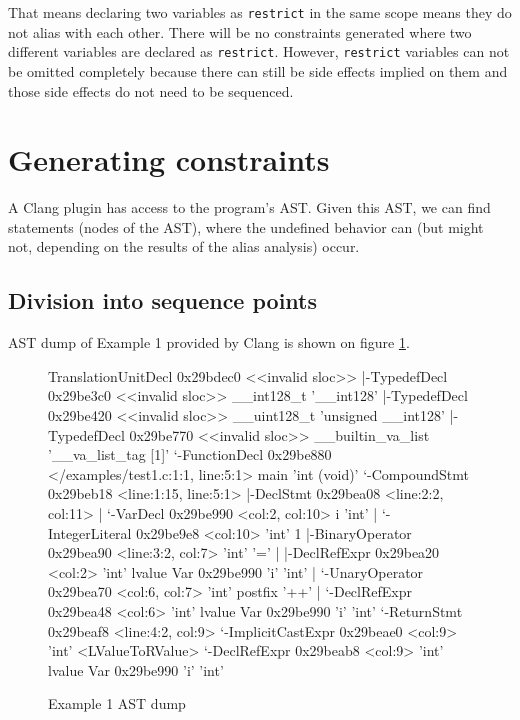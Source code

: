 That means declaring two variables as \verb|restrict| in the same scope means they do not alias with each other.
There will be no constraints generated where two different variables are declared as \verb|restrict|.
However, \verb|restrict| variables can not be omitted completely because there can still be side effects
implied on them and those side effects do not need to be sequenced.

\section{Generating constraints}
A Clang plugin has access to the program's AST. Given this AST, we can find statements (nodes of the AST), where the undefined behavior can (but might not, depending on the results of the alias analysis) occur.
\subsection{Division into sequence points}
AST dump of Example 1 provided by Clang is shown on figure \ref{ASTdump}.
\begin{figure}
\caption{Example 1 AST dump}
\label{ASTdump}
\begin{code}
TranslationUnitDecl 0x29bdec0 <<invalid sloc>>
|-TypedefDecl 0x29be3c0 <<invalid sloc>> __int128_t '__int128'
|-TypedefDecl 0x29be420 <<invalid sloc>> __uint128_t 'unsigned __int128'
|-TypedefDecl 0x29be770 <<invalid sloc>> __builtin_va_list '__va_list_tag [1]'
`-FunctionDecl 0x29be880 </examples/test1.c:1:1, line:5:1> main 'int (void)'
  `-CompoundStmt 0x29beb18 <line:1:15, line:5:1>
    |-DeclStmt 0x29bea08 <line:2:2, col:11>
    | `-VarDecl 0x29be990 <col:2, col:10> i 'int'
    |   `-IntegerLiteral 0x29be9e8 <col:10> 'int' 1
    |-BinaryOperator 0x29bea90 <line:3:2, col:7> 'int' '='
    | |-DeclRefExpr 0x29bea20 <col:2> 'int' lvalue Var 0x29be990 'i' 'int'
    | `-UnaryOperator 0x29bea70 <col:6, col:7> 'int' postfix '++'
    |   `-DeclRefExpr 0x29bea48 <col:6> 'int' lvalue Var 0x29be990 'i' 'int'
    `-ReturnStmt 0x29beaf8 <line:4:2, col:9>
      `-ImplicitCastExpr 0x29beae0 <col:9> 'int' <LValueToRValue>
        `-DeclRefExpr 0x29beab8 <col:9> 'int' lvalue Var 0x29be990 'i' 'int'
\end{code}
\end{figure}

